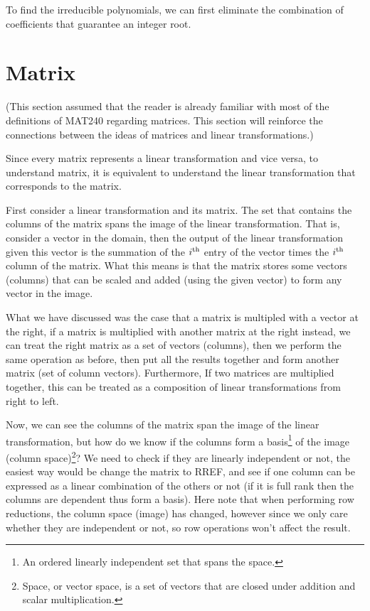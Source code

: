 \documentclass[11pt, cyan, night, 1in]{LatexTemplate/hw}
\begin{document}

To find the irreducible polynomials, we can first eliminate the combination of coefficients that guarantee an integer root. 


\section{Matrix}

(This section assumed that the reader is already familiar with most of the definitions of MAT240 regarding matrices. This section will reinforce the connections between the ideas of matrices and linear transformations.)

Since every matrix represents a linear transformation and vice versa, to understand matrix, it is equivalent to understand the linear transformation that corresponds to the matrix.

First consider a linear transformation and its matrix. The set that contains the columns of the matrix spans the image of the linear transformation. That is, consider a vector in the domain, then the output of the linear transformation given this vector is the summation of the $i^{\text{th}}$ entry of the vector times the $i^{\text{th}}$ column of the matrix. What this means is that the matrix stores some vectors (columns) that can be scaled and added (using the given vector) to form any vector in the image.

What we have discussed was the case that a matrix is multipled with a vector at the right, if a matrix is multiplied with another matrix at the right instead, we can treat the right matrix as a set of vectors (columns), then we perform the same operation as before, then put all the results together and form another matrix (set of column vectors). Furthermore, If two matrices are multiplied together, this can be treated as a composition of linear transformations from right to left.

Now, we can see the columns of the matrix span the image of the linear transformation, but how do we know if the columns form a basis\footnote{An ordered linearly independent set that spans the space.} of the image (column space)\footnote{Space, or vector space, is a set of vectors that are closed under addition and scalar multiplication.}? We need to check if they are linearly independent or not, the easiest way would be change the matrix to RREF, and see if one column can be expressed as a linear combination of the others or not (if it is full rank then the columns are dependent thus form a basis). Here note that when performing row reductions, the column space (image) has changed, however since we only care whether they are independent or not, so row operations won't affect the result. 
\end{document}
